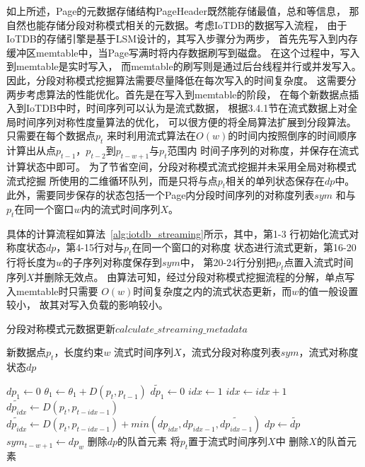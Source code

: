 如上所述，Page的元数据存储结构PageHeader既然能存储最值，总和等信息，
那自然也能存储分段对称模式相关的元数据。考虑IoTDB的数据写入流程，
由于IoTDB的存储引擎是基于LSM设计的，其写入步骤分为两步，
首先先写入到内存缓冲区memtable中，当Page写满时将内存数据刷写到磁盘。
在这个过程中，写入到memtable是实时写入，
而memtable的刷写则是通过后台线程并行或并发写入。
因此，分段对称模式挖掘算法需要尽量降低在每次写入的时间复杂度。
这需要分两步考虑算法的性能优化。首先是在写入到memtable的阶段，
在每个新数据点插入到IoTDB中时，时间序列可以认为是流式数据，
根据3.4.1节在流式数据上对全局时间序列对称性度量算法的优化，
可以很方便的将全局算法扩展到分段算法。只需要在每个数据点$p_t$
来时利用流式算法在$O(w)$的时间内按照倒序的时间顺序
计算出从点$p_{t-1}$，$p_{t-2}$到$p_{t-w+1}$与$p_t$范围内
时间子序列的对称度，并保存在流式计算状态中即可。
为了节省空间，分段对称模式流式挖掘并未采用全局对称模式流式挖掘
所使用的二维循环队列，而是只将与点$p_t$相关的单列状态保存在$dp$中。
此外，需要同步保存的状态包括一个Page内分段时间序列的对称度列表$sym$
和与$p_t$在同一个窗口$w$内的流式时间序列$X$。

具体的计算流程如算法~\ref{alg:iotdb_streaming}所示，其中，第1-3
行初始化流式对称度状态$dp$，第4-15行对与$p_t$在同一个窗口的对称度
状态进行流式更新，第16-20行将长度为$w$的子序列对称度保存到$sym$中，
第20-24行分别把$p_t$点置入流式时间序列$X$并删除无效点。
由算法可知，经过分段对称模式挖掘流程的分解，单点写入memtable时只需要
$O(w)$时间复杂度之内的流式状态更新，而$w$的值一般设置较小，
故其对写入负载的影响较小。


\renewcommand{\algorithmicrequire}{\textbf{输入：}\unskip}
\renewcommand{\algorithmicensure}{\textbf{输出：}\unskip}

\begin{algorithm}
  \caption{分段对称模式元数据更新$calculate\_streaming\_metadata$}
  \label{alg:iotdb_streaming}
  \small
  \begin{algorithmic}
    \REQUIRE 新数据点$p_t$，长度约束$w$
    \ENSURE 流式时间序列$X$，流式分段对称度列表$sym$，流式对称度状态$dp$

        \STATE $dp_{1} \leftarrow 0$
    \ELSE
      \STATE $\theta_1 \leftarrow \theta_1 + D\left(p_{t}, p_{t-1}\right)$
      \STATE $\widetilde{dp_1} \leftarrow 0$
      \STATE $ idx \leftarrow 1$
        \STATE $ idx \leftarrow idx+1$
          \STATE $\widetilde{dp_{idx}} \leftarrow D\left(p_{t}, p_{t-idx-1}\right)$
        \ELSE
          \STATE $\widetilde{dp_{idx}} \leftarrow D\left(p_{t}, p_{t-idx-1}\right)+min(dp_{idx},dp_{idx-1},\widetilde{dp_{idx-1}})$
        \ENDIF
      \ENDWHILE
      \STATE $ dp \leftarrow \widetilde{dp}$
        \STATE $sym_{t-w+1} \leftarrow dp_{w}$
        \STATE 删除$dp$的队首元素
      \ENDIF
    \ENDIF
    \STATE 将$p_t$置于流式时间序列$X$中
      \STATE 删除$X$的队首元素
    \ENDIF
  \end{algorithmic}
\end{algorithm}

